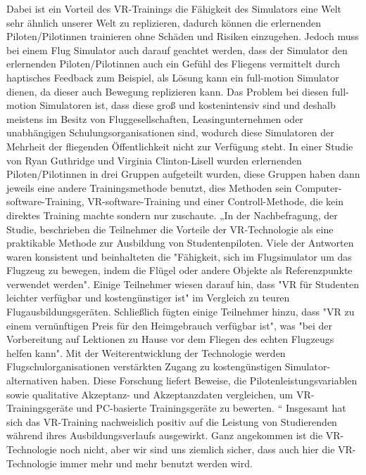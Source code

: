 Dabei ist ein Vorteil des VR-Trainings die Fähigkeit des Simulators eine Welt sehr ähnlich unserer Welt zu replizieren, dadurch können die erlernenden Piloten/Pilotinnen trainieren ohne Schäden und Risiken einzugehen. Jedoch muss bei einem Flug Simulator auch darauf geachtet werden, dass der Simulator den erlernenden Piloten/Pilotinnen auch ein Gefühl des Fliegens vermittelt durch haptisches Feedback zum Beispiel, als Lösung kann ein full-motion Simulator dienen, da dieser auch Bewegung replizieren kann. Das Problem bei diesen full-motion Simulatoren ist, dass diese groß und kostenintensiv sind und deshalb meistens im Besitz von Fluggesellschaften, Leasingunternehmen oder unabhängigen Schulungsorganisationen sind, wodurch diese Simulatoren der Mehrheit der fliegenden Öffentlichkeit nicht zur Verfügung steht. In einer Studie von Ryan Guthridge und Virginia Clinton-Lisell wurden erlernenden Piloten/Pilotinnen in drei Gruppen aufgeteilt wurden, diese Gruppen haben dann jeweils eine andere Trainingsmethode benutzt, dies Methoden sein Computer-software-Training, VR-software-Training und einer Controll-Methode, die kein direktes Training machte sondern nur zuschaute. „In der Nachbefragung, der Studie, beschrieben die Teilnehmer die Vorteile der VR-Technologie als eine praktikable Methode zur Ausbildung von Studentenpiloten. Viele der Antworten waren konsistent und beinhalteten die "Fähigkeit, sich im Flugsimulator um das Flugzeug zu bewegen, indem die Flügel oder andere Objekte als Referenzpunkte verwendet werden". Einige Teilnehmer wiesen darauf hin, dass "VR für Studenten leichter verfügbar und kostengünstiger ist" im Vergleich zu teuren Flugausbildungsgeräten. Schließlich fügten einige Teilnehmer hinzu, dass "VR zu einem vernünftigen Preis für den Heimgebrauch verfügbar ist", was "bei der Vorbereitung auf Lektionen zu Hause vor dem Fliegen des echten Flugzeugs helfen kann". Mit der Weiterentwicklung der Technologie werden Flugschulorganisationen verstärkten Zugang zu kostengünstigen Simulator-alternativen haben. Diese Forschung liefert Beweise, die Pilotenleistungsvariablen sowie qualitative Akzeptanz- und Akzeptanzdaten vergleichen, um VR-Trainingsgeräte und PC-basierte Trainingsgeräte zu bewerten. \cite{guthridge2023evaluating}“ 
Insgesamt hat sich das VR-Training nachweislich positiv auf die Leistung von Studierenden während ihres Ausbildungsverlaufs ausgewirkt. Ganz angekommen ist die VR-Technologie noch nicht, aber wir sind uns ziemlich sicher, dass auch hier die VR-Technologie immer mehr und mehr benutzt werden wird.
